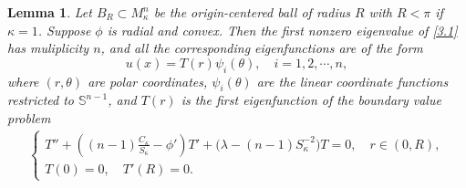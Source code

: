 \documentclass[10pt,a4paper]{amsart}
\newtheorem{lemma}{Lemma}
\def\k{\kappa}
\begin{document}
\begin{lemma}\label{lm3.1}
Let $B_R\subset M_\k^n$ be the origin-centered ball of radius $R$ with $R<\pi$ if $\k=1$. Suppose $\phi$ is  radial and convex. Then the first nonzero eigenvalue  of \eqref{3.1} has muliplicity $n$, and all the corresponding eigenfunctions are of the form
$$
u(x)=T(r)\psi_i(\theta), \quad i=1,2, \cdots, n,
$$
where $(r, \theta)$ are polar coordinates, $\psi_i(\theta)$ are the linear coordinate functions restricted to $\mathbb{S}^{n-1}$, and 
$T(r)$ is the first eigenfunction of the boundary value problem
\begin{align}\label{3.2}
    \begin{cases}
T'' + \left((n-1)\frac{C_\kappa}{S_\kappa} - \phi'\right)T' + \big(\lambda - (n-1)S_\kappa^{-2}\big)T = 0,\quad r\in (0, R),\\
T(0) = 0,\quad T'(R) = 0. 
\end{cases}
\end{align}
\end{lemma}
\end{document}
